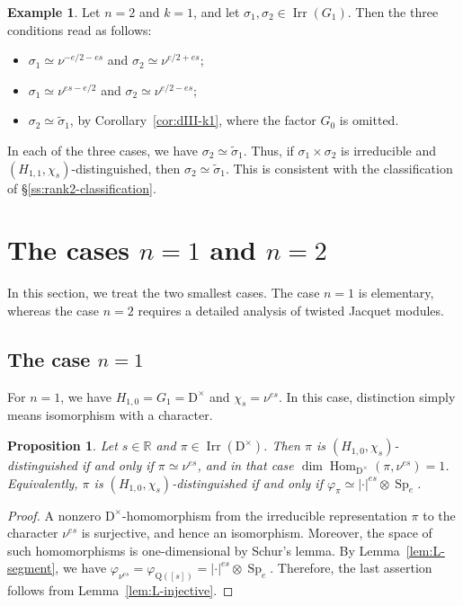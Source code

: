 \documentclass[11pt]{amsart}
\numberwithin{equation}{section}
\theoremstyle{plain}
\newtheorem{proposition}[theorem]{Proposition}
\theoremstyle{definition}
\newtheorem{example}[theorem]{Example}
\theoremstyle{remark}
\newcommand{\R}{\mathbb{R}}
\DeclareMathOperator{\Hom}{Hom}
\DeclareMathOperator{\Irr}{Irr}
\DeclareMathOperator{\Sp}{Sp}
\newcommand{\Qq}{\mathrm{Q}}
\begin{document}
\begin{example}\label{ex:n2-orbits}
	Let $n=2$ and $k=1$, and let $\sigma_1,\sigma_2\in\Irr(G_1)$. Then the three conditions read as follows:
	\begin{itemize}
		\item[(I)] $\sigma_1\simeq\nu^{-e/2-es}$ and $\sigma_2\simeq\nu^{e/2+es}$;
		\item[(II)] $\sigma_1\simeq\nu^{es-e/2}$ and $\sigma_2\simeq\nu^{e/2-es}$;
		\item[(III)] $\sigma_2\simeq\widetilde\sigma_1$, by Corollary~\ref{cor:dIII-k1}, where the factor $G_0$ is omitted.
	\end{itemize}
	In each of the three cases, we have $\sigma_2\simeq\widetilde\sigma_1$. Thus, if $\sigma_1\times\sigma_2$ is irreducible and $(H_{1,1},\chi_s)$-distinguished, then $\sigma_2\simeq\widetilde\sigma_1$. This is consistent with the classification of \S\ref{ss:rank2-classification}.
\end{example}

\section{The cases \texorpdfstring{$n=1$}{n=1} and \texorpdfstring{$n=2$}{n=2}}\label{sec:rank-two}

In this section, we treat the two smallest cases. The case $n=1$ is elementary, whereas the case $n=2$ requires a detailed analysis of twisted Jacquet modules.

\subsection{The case \texorpdfstring{$n=1$}{n=1}}\label{ss:n1}

For $n=1$, we have $H_{1,0}=G_1=\mathrm{D}^\times$ and $\chi_s=\nu^{es}$. In this case, distinction simply means isomorphism with a character.

\begin{proposition}\label{prop:n1}
	Let $s\in\R$ and $\pi\in\Irr(\mathrm{D}^\times)$. Then $\pi$ is $(H_{1,0},\chi_s)$-distinguished if and only if $\pi\simeq\nu^{es}$, and in that case $\dim\Hom_{\mathrm{D}^\times}(\pi,\nu^{es})=1$. Equivalently, $\pi$ is $(H_{1,0},\chi_s)$-distinguished if and only if $\varphi_{\pi}\simeq|\cdot|^{es}\otimes\Sp_e$.
\end{proposition}

\begin{proof}
	A nonzero $\mathrm{D}^\times$-homomorphism from the irreducible representation $\pi$ to the character $\nu^{es}$ is surjective, and hence an isomorphism. Moreover, the space of such homomorphisms is one-dimensional by Schur's lemma. By Lemma~\ref{lem:L-segment}, we have $\varphi_{\nu^{es}}=\varphi_{\Qq([s])}=|\cdot|^{es}\otimes\Sp_e$. Therefore, the last assertion follows from Lemma~\ref{lem:L-injective}.
\end{proof}
\end{document}
